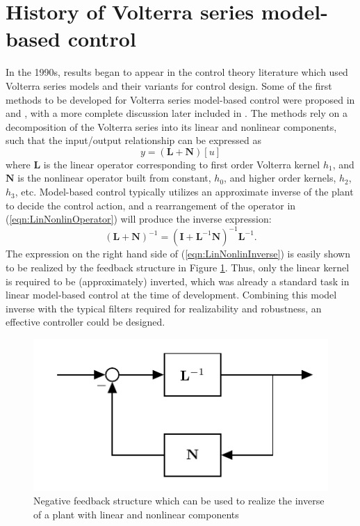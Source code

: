 \section{History of Volterra series model-based control}

In the 1990s, results began to appear in the control theory literature which used Volterra series models and their variants for control design. Some of the first methods to be developed for Volterra series model-based control were proposed in \cite{Maner1994} and \cite{Doyle1995}, with a more complete discussion later included in \cite{Doyle2002}. The methods rely on a decomposition of the Volterra series into its linear and nonlinear components, such that the input/output relationship can be expressed as
\begin{equation}
y = (\mathbf{L}+\mathbf{N}) [u]
\label{eqn:LinNonlinOperator}
\end{equation}
where $\mathbf{L}$ is the linear operator corresponding to first order Volterra kernel $h_1$, and $\mathbf{N}$ is the nonlinear operator built from constant, $h_0$, and higher order kernels, $h_2$, $h_3$, etc. Model-based control typically utilizes an approximate inverse of the plant to decide the control action, and a rearrangement of the operator in (\ref{eqn:LinNonlinOperator}) will produce the inverse expression:
\begin{equation}
(\mathbf{L}+\mathbf{N})^{-1} = (\mathbf{I} + \mathbf{L}^{-1}\mathbf{N})^{-1} \mathbf{L}^{-1}.
\label{eqn:LinNonlinInverse}
\end{equation}
The expression on the right hand side of (\ref{eqn:LinNonlinInverse}) is easily shown to be realized by the feedback structure in Figure \ref{fig:LinNonlinInvRealization}. Thus, only the linear kernel is required to be (approximately) inverted, which was already a standard task in linear model-based control at the time of development. Combining this model inverse with the typical filters required for realizability and robustness, an effective controller could be designed. 

\begin{figure}[h]
\centering
\includegraphics[scale = 1]{Chapter10_NMPC/VolterraIMC.pdf}
\caption{Negative feedback structure which can be used to realize the inverse of a plant with linear and nonlinear components}
\label{fig:LinNonlinInvRealization}
\end{figure}

